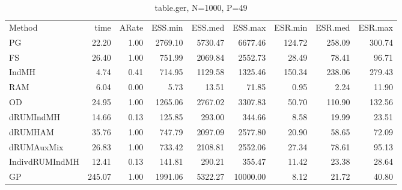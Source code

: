 \begin{table}
\label{tab:blogit-ger}
\begin{tabular}{l r r r r r r r r } 
          Method  &     time &    ARate &  ESS.min &  ESS.med &  ESS.max &  ESR.min &  ESR.med &  ESR.max \\ 
              PG  &    22.20 &     1.00 &  2769.10 &  5730.47 &  6677.46 &   124.72 &   258.09 &   300.74 \\ 
              FS  &    26.40 &     1.00 &   751.99 &  2069.84 &  2552.73 &    28.49 &    78.41 &    96.71 \\ 
           IndMH  &     4.74 &     0.41 &   714.95 &  1129.58 &  1325.46 &   150.34 &   238.06 &   279.43 \\ 
             RAM  &     6.04 &     0.00 &     5.73 &    13.51 &    71.85 &     0.95 &     2.24 &    11.90 \\ 
              OD  &    24.95 &     1.00 &  1265.06 &  2767.02 &  3307.83 &    50.70 &   110.90 &   132.56 \\ 
       dRUMIndMH  &    14.66 &     0.13 &   125.85 &   293.00 &   344.66 &     8.58 &    19.99 &    23.51 \\ 
         dRUMHAM  &    35.76 &     1.00 &   747.79 &  2097.09 &  2577.80 &    20.90 &    58.65 &    72.09 \\ 
      dRUMAuxMix  &    26.83 &     1.00 &   733.42 &  2108.81 &  2552.06 &    27.34 &    78.61 &    95.13 \\ 
  IndivdRUMIndMH  &    12.41 &     0.13 &   141.81 &   290.21 &   355.47 &    11.42 &    23.38 &    28.64 \\ 
              GP  &   245.07 &     1.00 &  1991.06 &  5322.27 & 10000.00 &     8.12 &    21.72 &    40.80
 \end{tabular}
\caption{table.ger, N=1000, P=49}
\end{table}

